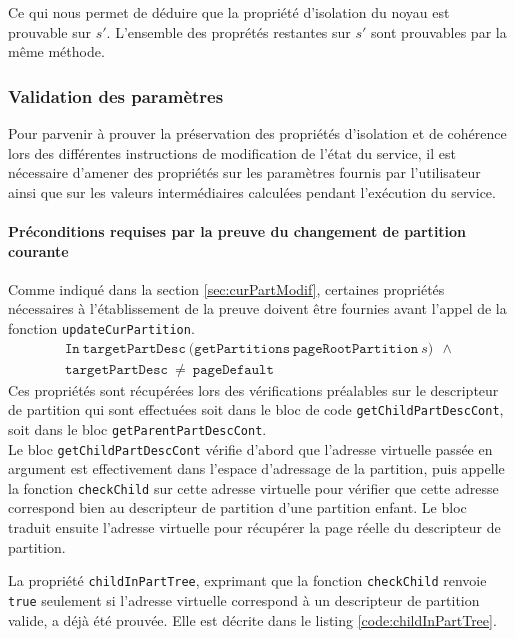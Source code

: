 			Ce qui nous permet de déduire que la propriété d'isolation du noyau est prouvable sur $s'$. L'ensemble des proprétés restantes sur $s'$ sont prouvables par la même méthode.

			\subsubsection{Validation des paramètres}
			Pour parvenir à prouver la préservation des propriétés d'isolation et de cohérence lors des différentes instructions de modification de l'état du service, il est nécessaire d'amener des propriétés sur les paramètres fournis par l'utilisateur ainsi que sur les valeurs intermédiaires calculées pendant l'exécution du service.

			\paragraph{Préconditions requises par la preuve du changement de partition courante}

			Comme indiqué dans la section \ref{sec:curPartModif}, certaines propriétés nécessaires à l'établissement de la preuve doivent être fournies avant l'appel de la fonction \texttt{updateCurPartition}.
			\begin{gather*}
				\mathtt{In~targetPartDesc~(getPartitions~pageRootPartition}~s)~~\wedge\\
				\mathtt{targetPartDesc}~\neq~\mathtt{pageDefault}
			\end{gather*}
			Ces propriétés sont récupérées lors des vérifications préalables sur le descripteur de partition qui sont effectuées soit dans le bloc de code \texttt{getChildPartDescCont}, soit dans le bloc \texttt{getParentPartDescCont}.\\

			Le bloc \texttt{getChildPartDescCont} vérifie d'abord que l'adresse virtuelle passée en argument est effectivement dans l'espace d'adressage de la partition, puis appelle la fonction \texttt{checkChild} sur cette adresse virtuelle pour vérifier que cette adresse correspond bien au descripteur de partition d'une partition enfant. Le bloc traduit ensuite l'adresse virtuelle pour récupérer la page réelle du descripteur de partition.

			La propriété \texttt{childInPartTree}, exprimant que la fonction \texttt{checkChild} renvoie \texttt{true} seulement si l'adresse virtuelle correspond à un descripteur de partition valide, a déjà été prouvée. Elle est décrite dans le listing \ref{code:childInPartTree}.

